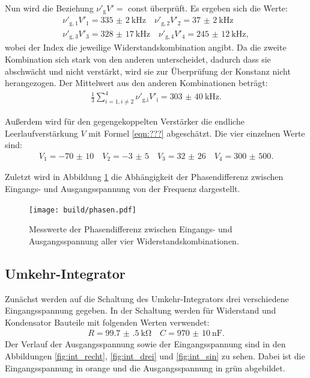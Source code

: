 Nun wird die Beziehung $\nu'_\text{g} V'=$ const überprüft. Es ergeben sich die Werte:
\begin{align*}
  \nu'_{\text{g}, 1} V'_1 = \SI{335(2)}{\kilo\hertz} \quad \nu'_{\text{g}, 2} V'_2 = \SI{37(2)}{\kilo\hertz}\\ \nu'_{\text{g}, 3} V'_3 = \SI{328(17)}{\kilo\hertz} \quad \nu'_{\text{g}, 4} V'_4 = \SI{245(12)}{\kilo\hertz},
\end{align*}
wobei der Index die jeweilige Widerstandskombination angibt. Da die zweite Kombination sich stark von den anderen unterscheidet, dadurch dass sie abschwächt und nicht verstärkt, wird sie zur Überprüfung der Konstanz nicht herangezogen.
Der Mittelwert aus den anderen Kombinationen beträgt:
\begin{align*}
  \frac{1}{3}\sum_{i=1, i\neq2}^4 \nu'_{\text{g}, \text{i}} V'_\text{i} = \SI{303(40)}{\kilo\hertz}.
\end{align*}

Außerdem wird für den gegengekoppelten Verstärker die endliche Leerlaufverstärkung $V$ mit Formel \eqref{eqn:???} abgeschätzt. Die vier einzelnen Werte sind:
\begin{align*}
  V_1 = \num{-70(10)} \quad V_2 = \num{-3(5)} \quad V_3 = \num{32(26)} \quad V_4 = \num{300(500)}.
\end{align*}

Zuletzt wird in Abbildung \ref{fig:phase} die Abhängigkeit der Phasendifferenz zwischen Eingangs- und Ausgangsspannung von der Frequenz dargestellt.

\begin{figure}
  \centering
  \texttt{[image: build/phasen.pdf]}
  \caption{Messwerte der Phasendifferenz zwischen Eingangs- und Ausgangsspannung aller vier Widerstandskombinationen.}
  \label{fig:phase}
\end{figure}

\subsection{Umkehr-Integrator}

Zunächst werden auf die Schaltung des Umkehr-Integrators drei verschiedene Eingangsspannung gegeben.
In der Schaltung werden für Widerstand und Kondensator Bauteile mit folgenden  Werten verwendet:
\begin{align*}
  R = \SI{99.7(5)}{\kilo\ohm} \quad C = \SI{970(10)}{\nano\farad}.
\end{align*}
Der Verlauf der Ausgangsspannung sowie der Eingangsspannung sind in den Abbildungen \ref{fig:int_recht}, \ref{fig:int_drei} und \ref{fig:int_sin} zu sehen. Dabei ist die Eingangsspannung in orange und die Ausgangsspannung in grün abgebildet.

